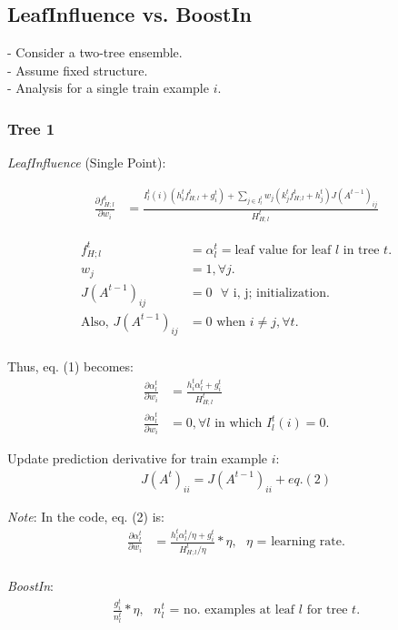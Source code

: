 \documentclass[12pt]{article}
\begin{document}
\subsection*{LeafInfluence vs. BoostIn}

- Consider a two-tree ensemble. \\
- Assume fixed structure. \\
- Analysis for a single train example $i$.

\subsubsection*{Tree 1}

\emph{LeafInfluence} (Single Point):

\begin{align}
\frac{\partial f_{H;l}^t}{\partial w_i} &= \frac{I_l^t(i) (h_i^t f_{H;l}^t + g_i^t) + \sum_{j \in I_l^t} w_j (k_j^t f_{H;l}^t + h_j^t) J(A^{t-1})_{ij}}{H_{H;l}^t}
\end{align}

\begin{align*}
f_{H;l}^t &= \alpha_l^t = \text{leaf value for leaf $l$ in tree $t$.} \\
w_j &= 1, \forall j. \\
J(A^{t-1})_{ij} &= 0 \text{ $\forall$ i, j; initialization.} \\
\text{Also, } J(A^{t-1})_{ij} &= 0 \text{ when } i \neq j, \forall t. \\
\end{align*}

Thus, eq. (1) becomes:
\begin{align}
\frac{\partial \alpha_l^t}{\partial w_i} &= \frac{h_i^t \alpha_l^t + g_i^t}{H_{H;l}^t} \\
\frac{\partial \alpha_l^t}{\partial w_i} &= 0, \forall l \text{ in which } I_l^t(i) = 0. \nonumber
\end{align}

Update prediction derivative for train example $i$:
\begin{align*}
J(A^t)_{ii} = J(A^{t-1})_{ii} + eq. (2)
\end{align*}

\emph{Note}: In the code, eq. (2) is:
\begin{align}
\frac{\partial \alpha_l^t}{\partial w_i} &= \frac{h_i^t \alpha_l^t / \eta + g_i^t}{H_{H;l}^t / \eta} * \eta, \text{ $\eta$ = learning rate.} \nonumber
\end{align}
\\
\emph{BoostIn}:
\begin{align}
\frac{g_i^t}{n_l^t} * \eta, \text{ $n_l^t$ = no. examples at leaf $l$ for tree $t$.} \nonumber
\end{align}
\end{document}
